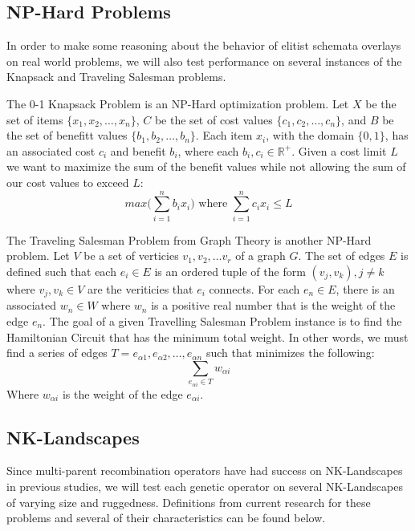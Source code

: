 %
%
\subsection*{NP-Hard Problems}

In order to make some reasoning about the behavior of elitist schemata overlays on real world problems, we will also test performance on several instances of the Knapsack and Traveling Salesman problems. 

The 0-1 Knapsack Problem is an NP-Hard optimization problem. Let $X$ be the set of items $\{x_1, x_2, \ldots, x_n\}$, $C$ be the set of cost values $\{c_1, c_2, \ldots, c_n\}$, and $B$ be the set of benefitt values $\{b_1, b_2, \ldots, b_n\}$. Each item $x_i$, with the domain $\{0,1\}$, has an associated cost $c_i$ and benefit $b_i$, where each $b_i,c_i \in \mathbb{R}^{+}$. Given a cost limit $L$ we want to maximize the sum of the benefit values while not allowing the sum of our cost values to exceed $L$:
\[ max\big( \sum\limits_{i = 1}^{n} b_ix_i \big) \text{ where } \sum\limits_{i = 1}^{n} c_ix_i \leq L \]

The Traveling Salesman Problem from Graph Theory is another NP-Hard problem. Let $V$ be a set of verticies $v_1, v_2, \ldots v_r$ of a graph $G$. The set of edges $E$ is defined such that each $e_i \in E$ is an ordered tuple of the form $(v_j,v_k), j \not = k$ where $v_j,v_k \in V$ are the veriticies that $e_i$ connects. For each $e_n \in E$, there is an associated $w_n \in W$ where $w_n$ is a positive real number that is the weight of the edge $e_n$. The goal of a given Travelling Salesman Problem instance is to find the Hamiltonian Circuit that has the minimum total weight. In other words, we must find a series of edges $T = e_{\alpha 1},e_{\alpha 2},\ldots,e_{\alpha n}$ such that minimizes the following\cite{Haxhimusa11}:
\[\sum\limits_{e_{\alpha i} \in T} w_{\alpha i}\]
\noindent Where $w_{\alpha i}$ is the weight of the edge $e_{\alpha i}$.

%
%

\subsection*{NK-Landscapes}

Since multi-parent recombination operators have had success on NK-Landscapes in previous studies, we will test each genetic operator on several NK-Landscapes of varying size and ruggedness\cite{Eiben96,Skellett05}. Definitions from current research for these problems and several of their characteristics can be found below\cite{molga05,Skellett05,yang10}.
